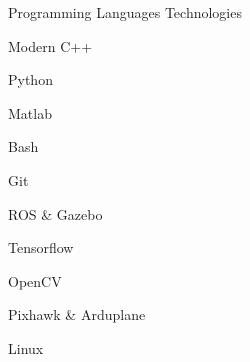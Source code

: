 
\begin{cventries}

  \cventrycolz
  {Programming Languages}
  {Technologies}
  {
    \begin{cvitems}
      \item {Modern C++}
      \item {Python}
      \item {Matlab}
      \item {Bash}
    \end{cvitems}
  }
  {
    \begin{cvitems}
      \item {Git}
      \item {ROS \& Gazebo}
      \item {Tensorflow}
      \item {OpenCV}
      \item {Pixhawk \& Arduplane}
      \item {Linux}
    \end{cvitems}
  }

\end{cventries}
